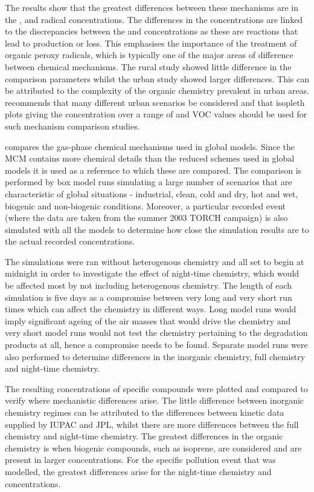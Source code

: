 The results show that the greatest differences between these mechanisms are in the ,  and  radical concentrations. 
The differences in the  concentrations are linked to the discrepancies between the  and  concentrations as these are reactions that lead to  production or loss. 
This emphasises the importance of the treatment of organic peroxy radicals, which is typically one of the major areas of difference between chemical mechanisms. 
The rural study showed little difference in the comparison parameters whilst the urban study showed larger differences. 
This can be attributed to the complexity of the organic chemistry prevalent in urban areas. 
\citep{Gross:2003} recommends that many different urban scenarios be considered and that  isopleth plots giving the  concentration over a range of  and VOC values should be used for such mechanism comparison studies. 

\citep{Emmerson:2009} compares the gas-phase chemical mechanisms used in global models. 
Since the MCM contains more chemical details than the reduced schemes used in global models it is used as a reference to which these are compared. 
The comparison is performed by box model runs simulating a large number of scenarios that are characteristic of global situations - industrial, clean, cold and dry, hot and wet, biogenic and non-biogenic conditions. 
Moreover, a particular recorded event (where the data are taken from the summer 2003 TORCH campaign) is also simulated with all the models to determine how close the simulation results are to the actual recorded concentrations. 

The simulations were ran without heterogenous chemistry and all set to begin at midnight in order to investigate the effect of night-time chemistry, which would be affected most by not including heterogenous chemistry. 
The length of each simulation is five days as a compromise between very long and very short run times which can affect the chemistry in different ways. 
Long model runs would imply significant ageing of the air masses that would drive the chemistry and very short model runs would not test the chemistry pertaining to the degradation products at all, hence a compromise needs to be found. 
Separate model runs were also performed to determine differences in the inorganic chemistry, full chemistry and night-time chemistry.

The resulting concentrations of specific compounds were plotted and compared to verify where mechanistic differences arise. 
The little difference between inorganic chemistry regimes can be attributed to the differences between kinetic data supplied by IUPAC and JPL, whilst there are more differences between the full chemistry and night-time chemistry. 
The greatest differences in the organic chemistry is when biogenic compounds, such as isoprene, are considered and are present in larger concentrations. 
For the specific pollution event that was modelled, the greatest differences arise for the night-time chemistry and  concentrations.

